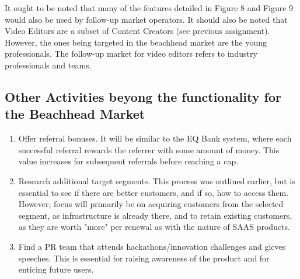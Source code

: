 \documentclass{article}
\begin{document}
        It ought to be noted that many of the features detailed in Figure 8 and Figure 9 would also be used by follow-up market operators. It should also be noted that Video Editors are a subset of Content Creators (see previous assignment). However, the ones being targeted in the beachhead market are the young professionals. The follow-up market for video editors refers to industry professionals and teams.

    \subsection{Other Activities beyong the functionality for the Beachhead Market}
        \begin{enumerate}
            \item Offer referral bonuses. It will be similar to the EQ Bank system, where each successful referral rewards the referrer with some amount of money. This value increases for subsequent referrals before reaching a cap.
            \item Research additional target segments. This process was outlined earlier, but is essential to see if there are better customers, and if so, how to access them. However, focus will primarily be on acquiring customers from the selected segment, as infrastructure is already there, and to retain existing customers, as they are worth "more" per renewal as with the nature of SAAS products.
            \item Find a PR team that attends hackathons/innovation challenges and gicves speeches. This is essential for raising awareness of the product and for enticing future users.
        \end{enumerate}
\end{document}
